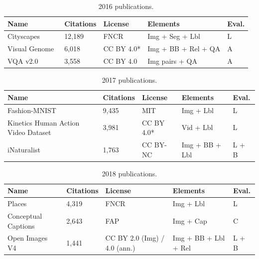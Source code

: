 ﻿\documentclass[11pt,a4paper]{article}
\begin{document}
\begin{table}[H]
\centering
\caption{2016 publications.}
\begin{tabular}{p{2.5cm}p{1.65cm}p{3.05cm}p{3.2cm}p{2.15cm}}
\hline
\textbf{Name} & \textbf{Citations} & \textbf{License} & \textbf{Elements} & \textbf{Eval.}\\
\hline
Cityscapes~\cite{cordts2016cityscapes} & 12,189 & FNCR & Img + Seg + Lbl & L\\
\hline
Visual Genome~\cite{krishna2017visualgenome} & 6,018 & CC BY 4.0* & Img + BB + Rel + QA & A\\
\hline
VQA v2.0~\cite{goyal2017vqa} & 3,558 & CC BY 4.0 & Img pairs + QA & A\\
\hline

\end{tabular}
\end{table}

\begin{table}[H]
\centering
\caption{2017 publications.}
\begin{tabular}{p{2.5cm}p{1.65cm}p{3.05cm}p{3.2cm}p{2.15cm}}
\hline
\textbf{Name} & \textbf{Citations} & \textbf{License} & \textbf{Elements} & \textbf{Eval.}\\
\hline
Fashion-MNIST~\cite{xiao2017fashionmnist} & 9,435 & MIT & Img + Lbl & L\\
\hline
Kinetics Human Action Video Dataset~\cite{kay2017kinetics} & 3,981 & CC BY 4.0* & Vid + Lbl & L\\
\hline
iNaturalist~\cite{vanhorn2018inaturalist} & 1,763 & CC BY-NC & Img + BB + Lbl & L + B\\
\hline

\end{tabular}
\end{table}

\begin{table}[H]
\centering
\caption{2018 publications.}
\begin{tabular}{p{2.5cm}p{1.65cm}p{3.05cm}p{3.2cm}p{2.15cm}}
\hline
\textbf{Name} & \textbf{Citations} & \textbf{License} & \textbf{Elements} & \textbf{Eval.}\\
\hline
Places~\cite{zhou2017places} & 4,319 & FNCR & Img + Lbl & L\\
\hline
Conceptual Captions~\cite{sharma2018conceptual} & 2,643 & FAP & Img + Cap & C\\
\hline
Open Images V4~\cite{kuznetsova2020openimages} & 1,441 & CC BY 2.0 (Img) / 4.0 (ann.) & Img + BB + Lbl + Rel & L + B\\
\hline

\end{tabular}
\end{table}
\end{document}
